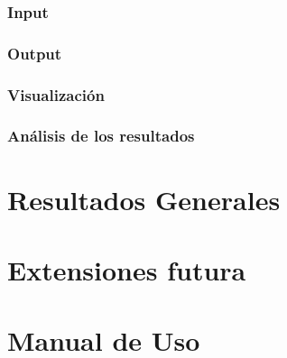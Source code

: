 \subsubsection{Input}

\subsubsection{Output}

\subsubsection{Visualizaci\'on}

\subsubsection{An\'alisis de los resultados}

\section{Resultados Generales}

\section{Extensiones futura}

\section{Manual de Uso}
